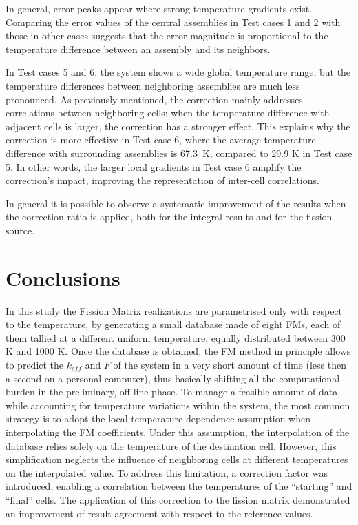 \documentclass[letterpaper]{physor2026}
\begin{document}
In general, error peaks appear where strong temperature gradients exist. Comparing the error values of the central assemblies in Test cases 1 and 2 with those in other cases suggests that the error magnitude is proportional to the temperature difference between an assembly and its neighbors.

In Test cases 5 and 6, the system shows a wide global temperature range, but the temperature differences between neighboring assemblies are much less pronounced. As previously mentioned, the correction mainly addresses correlations between neighboring cells: when the temperature difference with adjacent cells is larger, the correction has a stronger effect. This explains why the correction is more effective in Test case 6, where the average temperature difference with surrounding assemblies is 67.3~K, compared to 29.9 K in Test case 5. In other words, the larger local gradients in Test case 6 amplify the correction’s impact, improving the representation of inter-cell correlations.

In general it is possible to observe a systematic improvement of the results when the correction ratio is applied, both for the integral results and for the fission source. 

\section{Conclusions}
In this study the Fission Matrix realizations are parametrised only with respect to the temperature, by generating a small database made of eight FMs, each of them tallied at a different uniform temperature, equally distributed between 300 K and 1000 K. Once the database is obtained, the FM method in principle allows to predict the $k_{eff}$ and $F$ of the system in a very short amount of time (less then a second on a personal computer), thus basically shifting all the computational burden in the preliminary, off-line phase.     
To manage a feasible amount of data, while accounting for temperature variations within the system, the most common strategy is to adopt the local-temperature-dependence assumption when interpolating the FM coefficients. Under this assumption, the interpolation of the database relies solely on the temperature of the destination cell. However, this simplification neglects the influence of neighboring cells at different temperatures on the interpolated value. To address this limitation, a correction factor was introduced, enabling a correlation between the temperatures of the “starting” and “final” cells.
The application of this correction to the fission matrix demonstrated an improvement of result agreement with respect to the reference values. 
\end{document}
